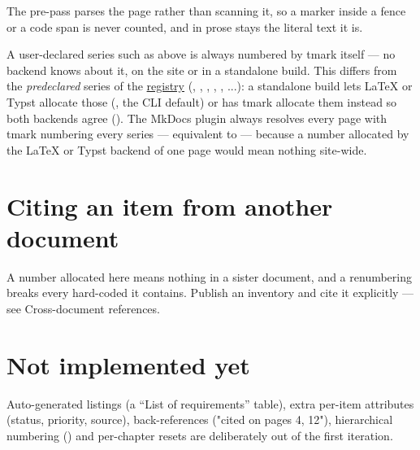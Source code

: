 \documentclass[a4paper,twoside]{article}
\begin{document}
The pre-pass parses the page rather than scanning it, so a marker inside a
fence or a code span is never counted, and  in prose stays the
literal text it is.

A user-declared series such as  above is always numbered by tmark itself
--- no backend knows about it, on the site or in a standalone build. This
differs from the \emph{predeclared} series of the \hyperref[one-registry-for-every-series]{registry}
(, , , , , ...): a standalone  build lets \LaTeX{}
or Typst allocate those (, the CLI default) or has tmark
allocate them instead so both backends agree (). The MkDocs
plugin always resolves every page with tmark numbering every series ---
equivalent to  --- because a number allocated by the \LaTeX{} or
Typst backend of one page would mean nothing site-wide.
\section{Citing an item from another document}
A number allocated here means nothing in a sister document, and a renumbering
breaks every hard-coded  it contains. Publish an inventory and cite it
explicitly --- see Cross-document references.
\section{Not implemented yet}
Auto-generated listings (a \enquote{List of requirements} table), extra per-item
attributes (status, priority, source), back-references ("cited on pages 4,
12"), hierarchical numbering () and per-chapter resets are deliberately
out of the first iteration.
\end{document}
